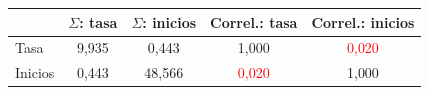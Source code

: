 \begin{tabular}{lcccc}
\toprule
 & $\Sigma$: tasa & $\Sigma$: inicios & Correl.: tasa & Correl.: inicios
\\ \midrule
Tasa & 9{,}935 & 0{,}443 & 1{,}000 & \textcolor{red}{0{,}020} \\
Inicios & 0{,}443 & 48{,}566 & \textcolor{red}{0{,}020} & 1{,}000 \\
\bottomrule
\end{tabular}
